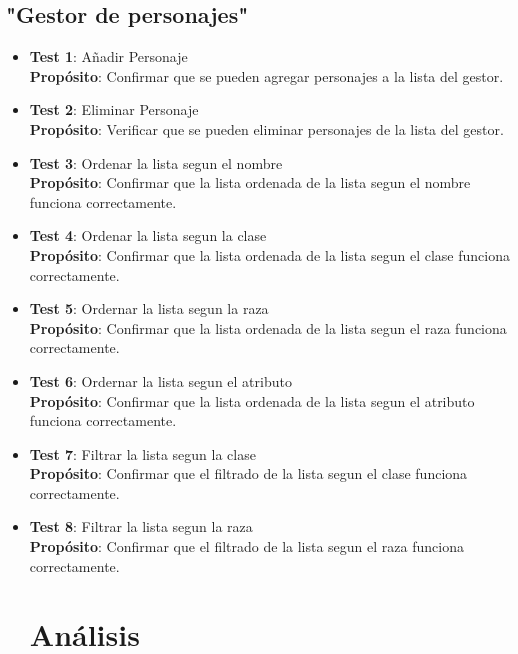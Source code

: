 \documentclass{article}
\begin{document}
\subsection{"Gestor de personajes"}
	\begin{itemize}

	\item \textbf{Test 1}: Añadir Personaje
\\ \textbf{Propósito}: Confirmar que se pueden agregar personajes a la lista del gestor.


	\item \textbf{Test 2}: Eliminar Personaje
\\ \textbf{Propósito}: Verificar que se pueden eliminar personajes de la lista del gestor.


	\item \textbf{Test 3}: Ordenar la lista segun el nombre
\\ \textbf{Propósito}: Confirmar que la lista ordenada de la lista segun el nombre funciona correctamente.


    \item \textbf{Test 4}: Ordenar la lista segun la clase
\\ \textbf{Propósito}: Confirmar que la lista ordenada de la lista segun el clase funciona correctamente.


    \item \textbf{Test 5}: Ordernar la lista segun la raza
\\ \textbf{Propósito}: Confirmar que la lista ordenada de la lista segun el raza funciona correctamente.


    \item \textbf{Test 6}: Ordernar la lista segun el atributo
\\ \textbf{Propósito}: Confirmar que la lista ordenada de la lista segun el atributo funciona correctamente.


    \item \textbf{Test 7}: Filtrar la lista segun la clase
\\ \textbf{Propósito}: Confirmar que el filtrado de la lista segun el clase funciona correctamente.


    \item \textbf{Test 8}: Filtrar la lista segun la raza
\\ \textbf{Propósito}: Confirmar que el filtrado de la lista segun el raza funciona correctamente.

\newpage
\section{Análisis}


\end{itemize}
\end{document}
